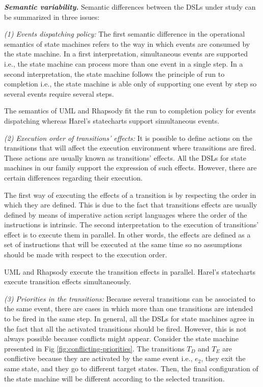 \documentclass[preprint,5p]{elsarticle}
\begin{document}
\vspace{2mm}
\textit{\textbf{Semantic variability.}} Semantic differences between the DSLs under study can be summarized in three issues:

\vspace{2mm}
\textit{(1) Events dispatching policy:} The first semantic difference in the operational semantics of state machines refers to the way in which events are consumed by the state machine. In a first interpretation, simultaneous events are supported i.e., the state machine can process more than one event in a single step. In a second interpretation, the state machine follows the principle of run to completion i.e., the state machine is able only of supporting one event by step so several events require several steps.

The semantics of UML and Rhapsody fit the run to completion policy for events dispatching whereas Harel's statecharts support simultaneous events.

\vspace{2mm}
\textit{(2) Execution order of transitions' effects:} It is possible to define actions on the transitions that will affect the execution environment where transitions are fired. These actions are usually known as transitions' effects. All the DSLs for state machines in our family support the expression of such effects. However, there are certain differences regarding their execution.

The first way of executing the effects of a transition is by respecting the order in which they are defined. This is due to the fact that transitions effects are usually defined by means of imperative action script languages where the order of the instructions is intrinsic. The second interpretation to the execution of transitions' effect is to execute them in parallel. In other words, the effects are defined as a set of instructions that will be executed at the same time so no assumptions should be made with respect to the execution order.

UML and Rhapsody execute the transition effects in parallel. Harel's statecharts execute transition effects simultaneously.

\vspace{2mm}
\textit{(3) Priorities in the transitions:} Because several transitions can be associated to the same event, there are cases in which more than one transitions are intended to be fired in the same step. In general, all the DSLs for state machines agree in the fact that all the activated transitions should be fired. However, this is not always possible because conflicts might appear. Consider the state machine presented in Fig \ref{fig:conflicting-priorities}. The transitions $T_D$ and $T_E$ are conflictive because they are activated by the same event i.e., $e_2$, they exit the same state, and they go to different target states. Then, the final configuration of the state machine will be different according to the selected transition.
\end{document}
